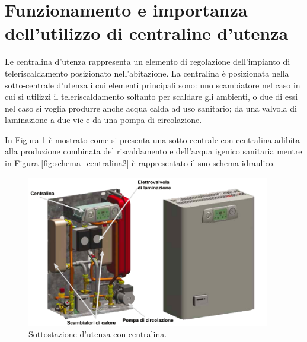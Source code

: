 \documentclass[laurea,oneside,11pt]{USiena_tesiLM3}
\begin{document}


\section{Funzionamento e importanza dell'utilizzo di centraline d'utenza}
\label{sec:centraline}
Le centralina d'utenza rappresenta un elemento di regolazione dell'impianto di teleriscaldamento posizionato nell'abitazione. La centralina è posizionata nella sotto-centrale d'utenza i cui elementi principali sono: uno scambiatore nel caso in cui si utilizzi il teleriscaldamento soltanto per scaldare gli ambienti, o due di essi nel caso si voglia produrre anche acqua calda ad uso sanitario; da una valvola di laminazione a due vie e da una pompa di circolazione. 

In Figura \ref{fig:centralina} è mostrato come si presenta una sotto-centrale con centralina adibita alla produzione combinata del riscaldamento e dell'acqua igenico sanitaria mentre in Figura \ref{fig:schema_centralina2} è rappresentato il suo schema idraulico.

\begin{figure}[!ht]
\centering
\includegraphics[width=0.95\textwidth]{figure/centralina} 
\caption{Sottostazione d'utenza con centralina.}
\label{fig:centralina}
\end{figure}
\end{document}
